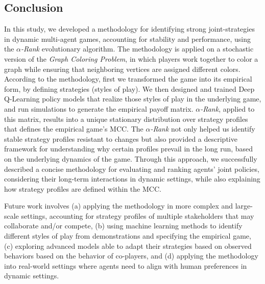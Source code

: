 \subsection{Conclusion}

    In this study, we developed a methodology for identifying strong joint-strategies in dynamic multi-agent games, accounting for stability and performance, using the \emph{$\alpha$-Rank} evolutionary algorithm. The methodology is applied on a stochastic version of the \emph{Graph Coloring Problem}, in which players work together to color a graph while ensuring that neighboring vertices are assigned different colors. According to the methodology, first we transformed the game into its empirical form, by defining strategies (styles of play). We then designed and trained Deep Q-Learning policy models that realize those styles of play in the underlying game, and run simulations to generate the empirical payoff matrix. \emph{$\alpha$-Rank}, applied to this matrix, results into a unique stationary distribution over strategy profiles that defines the empirical game's MCC. The \emph{$\alpha$-Rank} not only helped us identify stable strategy profiles resistant to changes but also provided a descriptive framework for understanding why certain profiles prevail in the long run, based on the underlying dynamics of the game. Through this approach, we successfully described a concise methodology for evaluating and ranking agents' joint policies, considering their long-term interactions in dynamic settings, while also explaining how strategy profiles are defined within the MCC.\tinydouble

    \noindent
    Future work involves (a) applying the methodology in more complex and large-scale settings, accounting for strategy profiles of multiple stakeholders that may collaborate and/or compete, (b) using machine learning methods to identify different styles of play from demonstrations and specifying the empirical game, (c) exploring advanced models able to adapt their strategies based on observed behaviors based on the behavior of co-players, and (d) applying the methodology into real-world settings where agents need to align with human preferences in dynamic settings.